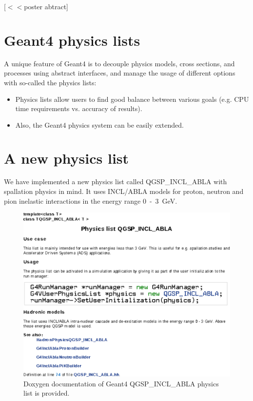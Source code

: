 \documentclass[a4paper]{jpconf}
\begin{document}
[$<<$poster abtract]


\section{Geant4 physics lists}

A unique feature of Geant4 is to  
decouple physics models, cross sections, and processes
using abstract interfaces, and manage the usage of different options with so-called the physics lists:
\begin{itemize}
\item Physics lists allow users to find good balance between various goals (e.g. CPU
time requirements vs. accuracy of results).
\item Also, the Geant4 physics system can be easily extended.
\end{itemize}



\section{A new physics list}

We have implemented a new physics list called {\sf QGSP\_\-INCL\_ABLA} with
spallation physics in mind. 
It uses INCL/ABLA models for proton,
neutron and pion inelastic interactions in the energy range 0~-~3~GeV.


\begin{figure}[h]
\begin{center}
\includegraphics[scale=0.80]{poster/images/inclAblaDoc.eps}
\caption{\label{label}Doxygen documentation of Geant4 {\sf QGSP\_\-INCL\_ABLA} physics list is provided.}
\end{center}
\end{figure}
\end{document}
